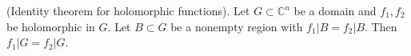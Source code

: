 (Identity theorem for holomorphic functions). Let $G \subset \mathbb{C}^n$ be a domain and $f_1, f_2$ be holomorphic in $G$. Let $B \subset G$ be a nonempty region with $f_1|B = f_2|B$. Then $f_1|G = f_2|G$.
